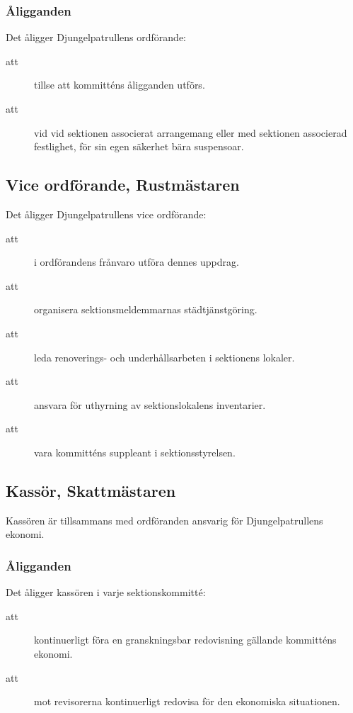 \documentclass[a4paper]{article}
\begin{document}
\begin{foreningenv}{\forening{}}
    \subsubsection{Åligganden}
    Det åligger Djungelpatrullens ordförande:
    \begin{description}
        \item[att] tillse att kommitténs åligganden utförs.
        \item[att] vid vid sektionen associerat arrangemang eller med sektionen associerad festlighet, för sin egen säkerhet bära suspensoar.
    \end{description}
    
    \subsection{Vice ordförande, Rustmästaren}
    Det åligger Djungelpatrullens vice ordförande:
    \begin{description}
        \item[att] i ordförandens frånvaro utföra dennes uppdrag.
        \item[att] organisera sektionsmeldemmarnas städtjänstgöring.
        \item[att] leda renoverings- och underhållsarbeten i sektionens lokaler.
        \item[att] ansvara för uthyrning av sektionslokalens inventarier.
        \item[att] vara kommitténs suppleant i sektionsstyrelsen.
    \end{description}
    
    \subsection{Kassör, Skattmästaren}
    Kassören är tillsammans med ordföranden ansvarig för Djungelpatrullens ekonomi.
    
    \subsubsection{Åligganden}
    Det åligger kassören i varje sektionskommitté:
    \begin{description}
        \item[att] kontinuerligt föra en granskningsbar redovisning gällande kommitténs ekonomi.
        \item[att] mot revisorerna kontinuerligt redovisa för den ekonomiska situationen.
    \end{description}
    

\end{foreningenv}
\end{document}
